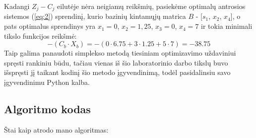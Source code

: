 \documentclass{article}
\begin{document}
\begin{table}[H]
    \centering
\end{table}
Kadangi $Z_j-C_j$ eilutėje nėra neigiamų reikšmių, pasiekėme optimalų antrosios sistemos (\ref{eq:2}) sprendinį, kurio bazinių kintamųjų matrica $B$ - [$s_1$, $x_2$, $x_4$], o pats optimalus sprendinys yra $x_1 = 0$, $x_2 = 1,25$, $x_3 = 0$, $x_4 = 7$ ir tokia minimali tikslo funkcijos reikšmė:
\begin{equation*}
    -(C_b\cdot X_b) = -(0\cdot6.75+3\cdot1.25+5\cdot7) = -38.75
\end{equation*}
Taip galima panaudoti simplekso metodą tiesiniam optimizavimo uždaviniui spręsti rankiniu būdu, tačiau vienas iš šio laboratorinio darbo tikslų buvo išspręsti jį taikant kodinį šio metodo įgyvendinimą, todėl pasidalinsiu savo įgyvendinimu Python kalba.
\subsection{Algoritmo kodas}
Štai kaip atrodo mano algoritmas:
\end{document}
